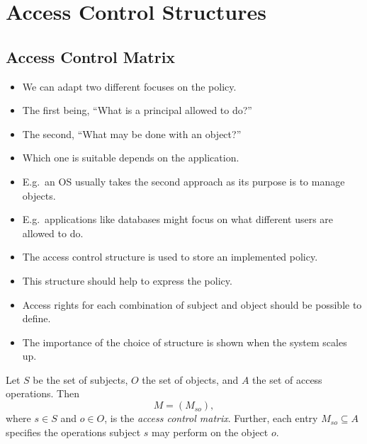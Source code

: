 \documentclass{beamer}
\begin{document}
\section{Access Control Structures}

\subsection{Access Control Matrix}

\begin{frame}{\insertsubsectionhead}
  \begin{itemize}
    \item We can adapt two different focuses on the policy.

    \item The first being, ``What is a principal allowed to do?''

    \item The second, ``What may be done with an object?''

    \item Which one is suitable depends on the application.

    \item E.g.\ an OS usually takes the second approach as its purpose is to 
      manage objects.

    \item E.g.\ applications like databases might focus on what different users 
      are allowed to do.
  \end{itemize}
\end{frame}

\begin{frame}{\insertsubsectionhead}
  \begin{itemize}
    \item The access control structure is used to store an implemented policy.

    \item This structure should help to express the policy.

    \item Access rights for each combination of subject and object should be 
      possible to define.

    \item The importance of the choice of structure is shown when the system 
      scales up.

  \end{itemize}
\end{frame}

\begin{frame}{\insertsubsectionhead}
  \begin{definition}
    Let \(S\) be the set of subjects, \(O\) the set of objects, and \(A\) the 
    set of access operations.
    Then \[ M = \left( M_{so} \right), \] where \(s\in S\) and \(o\in O\), is 
    the \emph{access control matrix}.
    Further, each entry \(M_{so}\subseteq A\) specifies the operations subject 
    \(s\) may perform on the object \(o\).
  \end{definition}
\end{frame}
\end{document}
